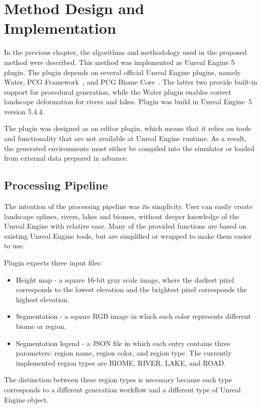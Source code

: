 \chapter{Method Design and Implementation}
\label{chap:ue_plugin}

In the previous chapter, the algorithms and methodology used in the proposed method were described. This method was implemented as Unreal Engine 5 plugin. The plugin depends on several official Unreal Engine plugins, namely Water, \ac{PCG} Framework~\cite{bk_pcg}, and \ac{PCG} Biome Core~\cite{bk_biome_core}. The latter two provide built-in support for procedural generation, while the Water plugin enables correct landscape deformation for rivers and lakes. Plugin was build in Unreal Engine~5 version 5.4.4.

The plugin was designed as an editor plugin, which means that it relies on tools and functionality that are not available at Unreal Engine runtime. As a result, the generated environments must either be compiled into the simulator or loaded from external data prepared in advance.

\section{Processing Pipeline}

The intention of the processing pipeline was its simplicity. User can easily create landscape splines, rivers, lakes and biomes, without deeper knowledge of the Unreal Engine with relative ease. Many of the provided functions are based on existing Unreal Engine tools, but are simplified or wrapped to make them easier to use.

Plugin expects three input files:
\begin{itemize}
	\item Height map - a square 16-bit gray scale image, where the darkest pixel corresponds to the lowest elevation and the brightest pixel corresponds the highest elevation.
	\item Segmentation - a square RGB image in which each color represents different biome or region.
	\item Segmentation legend - a JSON file in which each entry contains three parameters: region name, region color, and region type. The currently implemented region types are BIOME, RIVER, LAKE, and ROAD.
\end{itemize}
The distinction between these region types is necessary because each type corresponds to a different generation workflow and a different type of Unreal Engine object.

